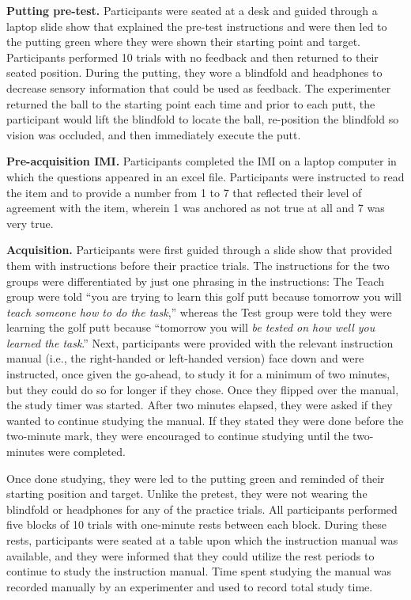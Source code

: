 \documentclass[
  english,
  man,floatsintext]{apa7}
\begin{document}
\textbf{Putting pre-test.} Participants were seated at a desk and guided through a laptop slide show that explained the pre-test instructions and were then led to the putting green where they were shown their starting point and target. Participants performed 10 trials with no feedback and then returned to their seated position. During the putting, they wore a blindfold and headphones to decrease sensory information that could be used as feedback. The experimenter returned the ball to the starting point each time and prior to each putt, the participant would lift the blindfold to locate the ball, re-position the blindfold so vision was occluded, and then immediately execute the putt.

\textbf{Pre-acquisition IMI.} Participants completed the IMI on a laptop computer in which the questions appeared in an excel file. Participants were instructed to read the item and to provide a number from 1 to 7 that reflected their level of agreement with the item, wherein 1 was anchored as not true at all and 7 was very true.

\textbf{Acquisition.} Participants were first guided through a slide show that provided them with instructions before their practice trials. The instructions for the two groups were differentiated by just one phrasing in the instructions: The Teach group were told ``you are trying to learn this golf putt because tomorrow you will \emph{teach someone how to do the task},'' whereas the Test group were told they were learning the golf putt because ``tomorrow you will \emph{be tested on how well you learned the task}.'' Next, participants were provided with the relevant instruction manual (i.e., the right-handed or left-handed version) face down and were instructed, once given the go-ahead, to study it for a minimum of two minutes, but they could do so for longer if they chose. Once they flipped over the manual, the study timer was started. After two minutes elapsed, they were asked if they wanted to continue studying the manual. If they stated they were done before the two-minute mark, they were encouraged to continue studying until the two-minutes were completed.

Once done studying, they were led to the putting green and reminded of their starting position and target. Unlike the pretest, they were not wearing the blindfold or headphones for any of the practice trials. All participants performed five blocks of 10 trials with one-minute rests between each block. During these rests, participants were seated at a table upon which the instruction manual was available, and they were informed that they could utilize the rest periods to continue to study the instruction manual. Time spent studying the manual was recorded manually by an experimenter and used to record total study time.
\end{document}
